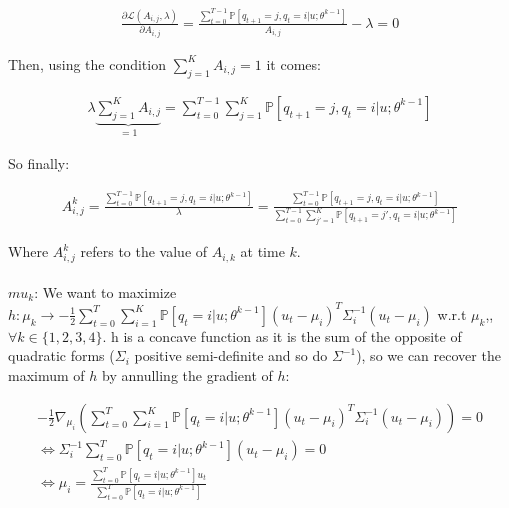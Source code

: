 \documentclass[11pt]{article}
\numberwithin{figure}{section} %
\begin{document}
\begin{align*}
\frac{\partial \mathcal{L}(A_{i,j}, \lambda)}{\partial A_{i,j}} = \frac{\sum\limits_{t=0}^{T-1} \mathbb{P}[q_{t+1} = j, q_t = i | u; \theta^{k-1}]}{A_{i,j}} - \lambda = 0
\end{align*}

Then, using the condition $\sum\limits_{j=1}^K A_{i,j} = 1$ it comes:

\begin{align*}
\lambda \underbrace{\sum\limits_{j=1}^K A_{i,j}}_{= 1} = \sum\limits_{t=0}^{T-1} \sum\limits_{j=1}^K  \mathbb{P}[q_{t+1} = j, q_t = i | u; \theta^{k-1}]
\end{align*}

So finally:
\begin{framed}
\begin{align*}
A_{i,j}^k = \frac{\sum\limits_{t=0}^{T-1} \mathbb{P}[q_{t+1} = j, q_t = i | u; \theta^{k-1}]}{\lambda} = \frac{\sum\limits_{t=0}^{T-1} \mathbb{P}[q_{t+1} = j, q_t = i | u; \theta^{k-1}]}{\sum\limits_{t=0}^{T-1} \sum\limits_{j'=1}^K  \mathbb{P}[q_{t+1} = j', q_t = i | u; \theta^{k-1}]}
\end{align*}
\end{framed}

Where $A_{i,j}^k$ refers to the value of $A_{i,k}$ at time $k$. \\
\\

$mu_k$: We want to maximize $h : \mu_k \rightarrow -\frac{1}{2} \sum\limits_{t=0}^{T} \sum\limits_{i=1}^K \mathbb{P}[q_t = i | u; \theta^{k-1}] (u_t - \mu_i)^T \Sigma^{-1}_i (u_t - \mu_i)$ w.r.t $\mu_k$,, $\forall k \in \{1,2,3,4\}$. h is a concave function as it is the sum of the opposite of quadratic forms ($\Sigma_i$ positive semi-definite and so do $\Sigma^{-1}$), so we can recover the maximum of $h$ by annulling the gradient of $h$:

\begin{align*}
-\frac{1}{2} \nabla_{\mu_i} \left( \sum\limits_{t=0}^{T} \sum\limits_{i=1}^K \mathbb{P}[q_t = i | u; \theta^{k-1}] (u_t - \mu_i)^T \Sigma^{-1}_i (u_t - \mu_i) \right) = 0 \\
\Leftrightarrow \Sigma^{-1}_i \sum\limits_{t=0}^T \mathbb{P}[q_t = i | u; \theta^{k-1}] (u_t - \mu_i) = 0 \\
\Leftrightarrow \mu_i = \frac{\sum\limits_{t=0}^T \mathbb{P}[q_t = i | u; \theta^{k-1}] u_t}{\sum\limits_{t=0}^T \mathbb{P}[q_t = i | u; \theta^{k-1}]}
\end{align*}
\end{document}
